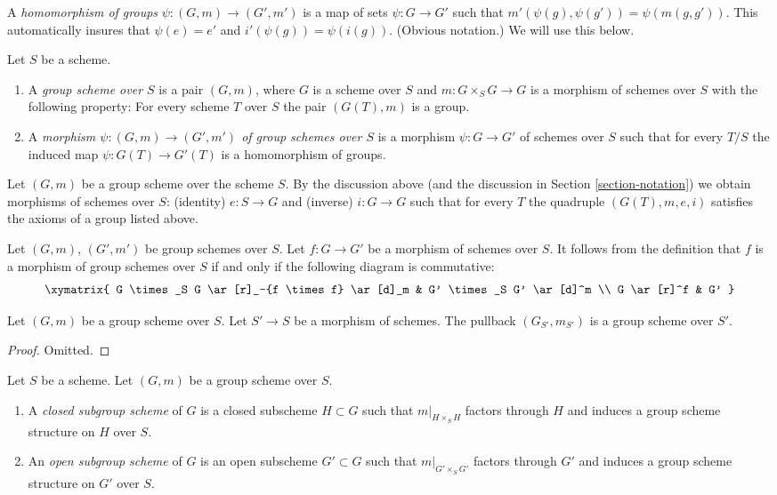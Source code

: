 \medskip\noindent
A {\it homomorphism of groups} $\psi : (G, m) \to (G', m')$
is a map of sets $\psi : G \to G'$ such that
$m'(\psi(g), \psi(g')) = \psi(m(g, g'))$. This automatically
insures that $\psi(e) = e'$ and $i'(\psi(g)) = \psi(i(g))$.
(Obvious notation.) We will use this below.

\begin{definition}
\label{definition-group-scheme}
Let $S$ be a scheme.
\begin{enumerate}
\item A {\it group scheme over $S$} is a pair $(G, m)$, where
$G$ is a scheme over $S$ and $m : G \times_S G \to G$ is
a morphism of schemes over $S$ with the following property:
For every scheme $T$ over $S$ the pair $(G(T), m)$
is a group.
\item A {\it morphism $\psi : (G, m) \to (G', m')$ of group schemes over $S$}
is a morphism $\psi : G \to G'$ of schemes over $S$ such that for
every $T/S$ the induced map $\psi : G(T) \to G'(T)$ is a homomorphism
of groups.
\end{enumerate}
\end{definition}

\noindent
Let $(G, m)$ be a group scheme over the scheme $S$.
By the discussion above (and the discussion in Section \ref{section-notation})
we obtain morphisms of schemes over $S$:
(identity) $e : S \to G$ and (inverse) $i : G \to G$ such that
for every $T$ the quadruple $(G(T), m, e, i)$ satisfies the
axioms of a group listed above.

\medskip\noindent
Let $(G, m)$, $(G', m')$ be group schemes over $S$.
Let $f : G \to G'$ be a morphism of schemes over $S$.
It follows from the definition that $f$ is a morphism
of group schemes over $S$ if and only if the following diagram
is commutative:
$$
\xymatrix{
G \times_S G \ar[r]_-{f \times f} \ar[d]_m &
G' \times_S G' \ar[d]^m \\
G \ar[r]^f & G'
}
$$

\begin{lemma}
\label{lemma-base-change-group-scheme}
Let $(G, m)$ be a group scheme over $S$.
Let $S' \to S$ be a morphism of schemes.
The pullback $(G_{S'}, m_{S'})$ is a group scheme over $S'$.
\end{lemma}

\begin{proof}
Omitted.
\end{proof}

\begin{definition}
\label{definition-closed-subgroup-scheme}
Let $S$ be a scheme. Let $(G, m)$ be a group scheme over $S$.
\begin{enumerate}
\item A {\it closed subgroup scheme} of $G$ is a closed subscheme
$H \subset G$ such that $m|_{H \times_S H}$ factors through $H$ and induces a
group scheme structure on $H$ over $S$.
\item An {\it open subgroup scheme} of $G$ is an open subscheme
$G' \subset G$ such that $m|_{G' \times_S G'}$ factors through $G'$
and induces a group scheme structure on $G'$ over $S$.
\end{enumerate}
\end{definition}

